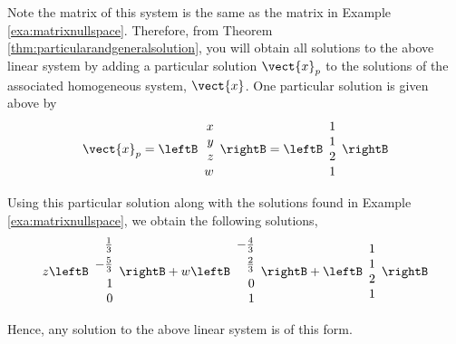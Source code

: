 \begin{solution} Note the matrix of this system is the same as the matrix in Example 
\ref{exa:matrixnullspace}. Therefore, from Theorem \ref{thm:particularandgeneralsolution}, you will obtain all
solutions to the above linear system by adding a particular solution $\vect{x}_p$ to the solutions of the associated homogeneous 
system, $\vect{x}$. One particular solution is given above by
\begin{equation}
\vect{x}_p
=
\leftB
\begin{array}{r}
x \\
y \\
z \\
w
\end{array}
\rightB=\leftB
\begin{array}{r}
1 \\
1 \\
2 \\
1
\end{array}
\rightB
\end{equation}

Using this particular solution along with the solutions found in Example \ref{exa:matrixnullspace}, we
obtain the following solutions, 
\begin{equation*}
z\leftB
\begin{array}{r}
\vspace{0.05in}\frac{1}{3} \\
-\vspace{0.05in}\frac{5}{3} \\
1 \\
0
\end{array}
\rightB +w\leftB
\begin{array}{r}
-\vspace{0.05in}\frac{4}{3} \\
\vspace{0.05in}\frac{2}{3} \\
0 \\
1
\end{array}
\rightB +\leftB
\begin{array}{r}
1 \\
1 \\
2 \\
1
\end{array}
\rightB 
\end{equation*}

Hence, any solution to the above linear system is of this form.
\end{solution} 